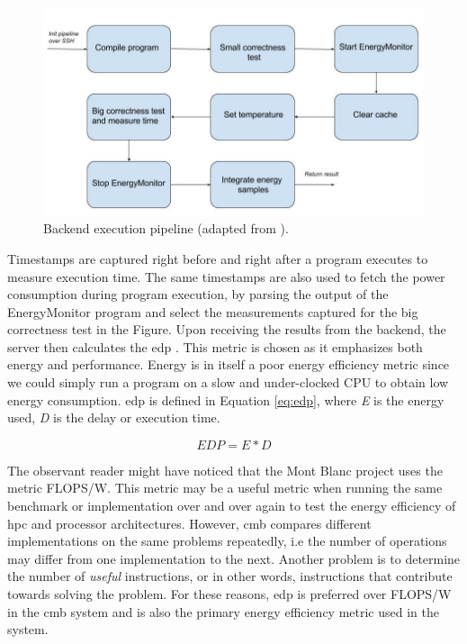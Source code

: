 \begin{figure}
  \includegraphics[width=1.0\textwidth]{figs/execution_pipeline.jpg}
  \caption[Backend execution pipeline.]{Backend execution pipeline (adapted from \cite{mt:T&S}).}
  \label{fig:execution-pipeline}
\end{figure}

Timestamps are captured right before and right after a program executes to measure execution time. The same timestamps are also used to fetch the power consumption during program execution, by parsing the output of the EnergyMonitor program and select the measurements captured for the big correctness test in the Figure. Upon receiving the results from the backend, the server then calculates the \gls{edp} \cite{a:edp}. This metric is chosen as it emphasizes both energy and performance. Energy is in itself a poor energy efficiency metric since we could simply run a program on a slow and under-clocked CPU to obtain low energy consumption. \gls{edp} is defined in Equation \ref{eq:edp}, where \textit{E} is the energy used, \textit{D} is the delay or execution time.

\begin{equation}
  \label{eq:edp}
  EDP = E * D
\end{equation}

The observant reader might have noticed that the Mont Blanc project uses the metric FLOPS/W. This metric may be a useful metric when running the same benchmark or implementation over and over again to test the energy efficiency of \gls{hpc} and processor architectures. However, \gls{cmb} compares different implementations on the same problems repeatedly, i.e the number of operations may differ from one implementation to the next. Another problem is to determine the number of \textit{useful} instructions, or in other words, instructions that contribute towards solving the problem. For these reasons, \gls{edp} is preferred over FLOPS/W in the \gls{cmb} system and is also the primary energy efficiency metric used in the system.

